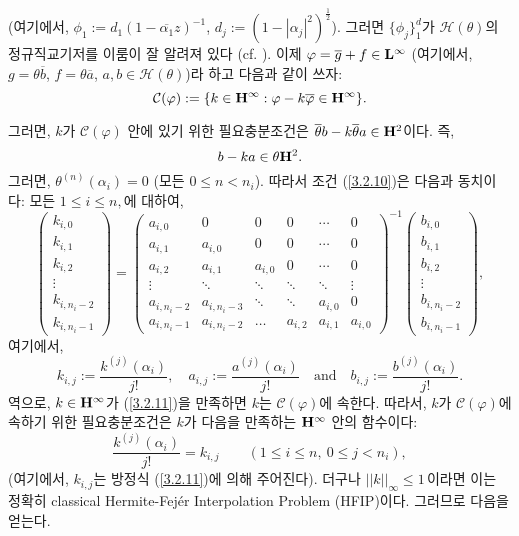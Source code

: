\documentclass[12pt,a4paper,2sided]{article}
\begin{document}
\noindent (여기에서, $\phi_1 :=d_1(1- \overline{\alpha_1}z)^{-1}$,
$d_j:=(1-|\alpha_j |^2)^{\frac{1}{2}}$). 그러면 $\{\phi_j \}_1^d$가
$\mathcal H (\theta)$의 정규직교기저를 이룸이 잘 알려져 있다 (cf.
\cite[Theorem X.1.5]{FF}). 이제 $\varphi=\overline g+f\in \bold
L^\infty$ (여기에서, $g=\theta \overline b$, $f=\theta \overline a$,
$a, b\in \mathcal H (\theta)$)라 하고 다음과 같이 쓰자:
$$
\mathcal{C}(\varphi):= \{k \in \bold H^{\infty} : \varphi -k
\overline{\varphi} \in \bold H^{\infty}\}.
$$
\newpage{}

\vspace{.8 cm} \noindent 그러면, $k$가 $\mathcal{C}(\varphi)$ 안에
있기 위한 필요충분조건은 $\overline {\theta} b-k \overline{\theta}a
\in \bold H^2$이다. 즉,
\begin{equation}\label{3.2.10}
b-ka \in \theta \bold H^2 .
\end{equation}
그러면, $\theta^{(n)} (\alpha_i) =0$ (모든 $0 \leq n  < n_i$).
따라서 조건 (\ref{3.2.10})은 다음과 동치이다:
모든 $1 \leq i \leq n,$에 대하여,
\begin{equation}\label{3.2.11}
\begin{pmatrix} k_{i,0}\\
k_{i,1}\\
k_{i,2}\\
\vdots\\
k_{i,n_i -2}\\
k_{i,n_i -1}
\end{pmatrix}
=\begin{pmatrix} a_{i,0}&0&0&0&\cdots&0\\
a_{i,1}&a_{i,0}&0&0&\cdots&0\\
a_{i,2}&a_{i,1}&a_{i,0}&0&\cdots&0\\
\vdots&\ddots&\ddots&\ddots&\ddots&\vdots \\
a_{i,n_i -2}&a_{i,n_i -3}&\ddots&\ddots&a_{i,0}&0\\
a_{i,n_i -1}&a_{i,n_i -2}&\hdots&a_{i,2}&a_{i,1}&a_{i,0}
\end{pmatrix}^{-1}
\begin{pmatrix} b_{i,0}\\
b_{i,1}\\
b_{i,2}\\
\vdots\\
b_{i,n_i -2}\\
b_{i,n_i -1}
\end{pmatrix},
\end{equation}
여기에서,
$$
k_{i,j}:= \frac{k^{(j)}(\alpha_i)}{j!},\quad a_{i,j}:=
\frac{a^{(j)}(\alpha_i)}{j!} \quad\text{and}\quad
b_{i,j}:=\frac{b^{(j)}(\alpha_i)}{j!}.
$$
역으로, $k \in \bold H^{\infty}$가 (\ref{3.2.11})을 만족하면 $k$는
$\mathcal{C}(\varphi)$에 속한다. 따라서, $k$가
$\mathcal{C}(\varphi)$에 속하기 위한 필요충분조건은  $k$가 다음을
만족하는 $\bold H^{\infty}$ 안의 함수이다:
\begin{equation}\label{3.2.12}
\frac{k^{(j)}(\alpha_i)}{j!} = k_{i,j} \qquad (1 \leq i \leq n, \
0 \leq j < n_i),
\end{equation}
(여기에서, $k_{i,j}$는 방정식 (\ref{3.2.11})에 의해 주어진다).
더구나 $||k||_\infty\le 1$\,이라면 이는 정확히  classical
Hermite-Fej\' er Interpolation Problem (HFIP)이다. 그러므로 다음을
얻는다.
\end{document}
